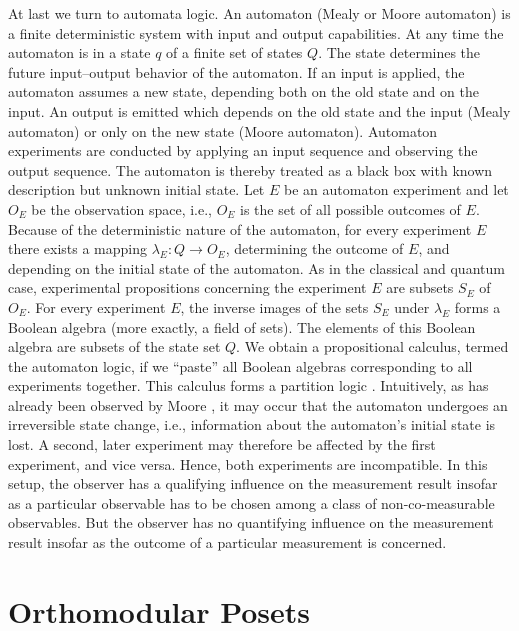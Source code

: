 At last we turn to automata logic.
An automaton (Mealy or Moore automaton) is a finite deterministic system
with input and output capabilities.
At any time the automaton is in a state $q$ of a finite set of states $Q$.
The state determines the future input--output behavior of the automaton.
If an input is applied, the automaton assumes a new state, depending
both on the old state and on the input. An output is emitted
which depends on the old state and the input
(Mealy automaton) or only on the new state (Moore
automaton).
Automaton experiments are conducted by applying an input sequence and
observing the output sequence.
The automaton is thereby treated as a black box with known
description but unknown initial state.
Let $E$ be an automaton experiment and let $O_E$ be the observation space,
i.e., $O_E$ is the set of all possible outcomes of $E$.
Because of the deterministic nature of the automaton,
for every experiment $E$ there exists a mapping $\lambda_E: Q \rightarrow O_E$,
determining the outcome of $E$, and depending on the initial state
of the automaton.
As in the classical and quantum case, experimental propositions concerning
the experiment $E$
are subsets $S_E$ of $O_E$.
For every experiment $E$, the inverse images of the sets $S_E$
under $\lambda_E$ forms a Boolean algebra
(more exactly, a field of sets). The elements of this
Boolean algebra are subsets of the state set $Q$.
We obtain a propositional calculus, termed the automaton logic,
if we ``paste'' all Boolean algebras corresponding to all experiments
together. This calculus forms a partition logic \cite{svozil,schaller}.
Intuitively, as
has already been observed by Moore \cite{moore}, it may
occur that the automaton undergoes an irreversible state change, i.e.,
information about the automaton's initial state is lost.
A second, later experiment may therefore be affected by the first experiment,
and vice versa.
Hence, both experiments are incompatible.
In this setup, the observer has a qualifying influence on the measurement
result insofar as a particular observable has to be chosen among a class
of non-co-measurable observables.
But the observer has no quantifying influence on the measurement result
insofar as the outcome of a particular measurement is concerned.


\section{Orthomodular Posets}

